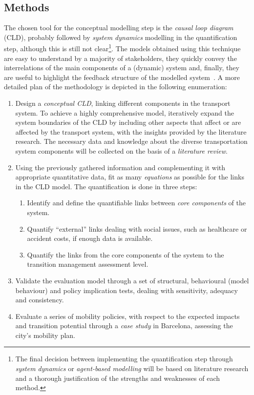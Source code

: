 \documentclass[a4paper,fontsize=10pt,bibliography=totoc]{scrartcl}
\begin{document}
\begin{multicols}{2}
\subsection*{Methods}
The chosen tool for the conceptual modelling step is the \textit{causal loop diagram} (CLD), probably followed by \textit{system dynamics} modelling in the quantification step, although this is still not clear\footnote{The final decision between implementing the quantification step through \textit{system dynamics} or \textit{agent-based modelling} will be based on literature research and a thorough justification of the strengths and weaknesses of each method.}. The models obtained using this technique are easy to understand by a majority of stakeholders, they quickly convey the interrelations of the main components of a (dynamic) system and, finally, they are useful to highlight the feedback structure of the modelled system~\parencite{ghosh2015_DynamicSystemsEveryone}. A more detailed plan of the methodology is depicted in the following enumeration:
%
\begin{enumerate}[label=(\alph*)]
	\item Design a \textit{conceptual CLD}, linking different components in the transport system. To achieve a highly comprehensive model, iteratively expand the system boundaries of the CLD by including other aspects that affect or are affected by the transport system, with the insights provided by the literature research. The necessary data and knowledge about the diverse transportation system components will be collected on the basis of a \textit{literature review}.
	\item Using the previously gathered information and complementing it with appropriate quantitative data, fit as many \textit{equations} as possible for the links in the CLD model. The quantification is done in three steps:
	\begin{enumerate}[label=\roman*.]
		\item Identify and define the quantifiable links between \textit{core components} of the system.
		\item Quantify ``external'' links dealing with social issues, such as healthcare or accident costs, if enough data is available.
		\item Quantify the links from the core components of the system to the transition management assessment level.
	\end{enumerate}
	\item Validate the evaluation model through a set of structural, behavioural (model behaviour) and policy implication tests, dealing with sensitivity, adequacy and consistency.
	\item Evaluate a series of mobility policies, with respect to the expected impacts and transition potential through a \textit{case study} in Barcelona, assessing the city's mobility plan.
\end{enumerate}


\end{multicols}
\end{document}
